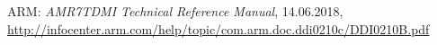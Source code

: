 \begin{thebibliography}{99}
	 ARM: \emph{AMR7TDMI Technical Reference Manual}, 14.06.2018, \url{http://infocenter.arm.com/help/topic/com.arm.doc.ddi0210c/DDI0210B.pdf}
\end{thebibliography}